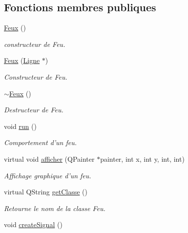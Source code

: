 \subsection*{Fonctions membres publiques}
\begin{DoxyCompactItemize}
\item 
\hypertarget{classFeux_a2474d3dc42d3a0d60427f0d2ccf2472e}{
\hyperlink{classFeux_a2474d3dc42d3a0d60427f0d2ccf2472e}{Feux} ()}
\label{classFeux_a2474d3dc42d3a0d60427f0d2ccf2472e}

\begin{DoxyCompactList}\small\item\em constructeur de Feu. \item\end{DoxyCompactList}\item 
\hyperlink{classFeux_a875eac84cbac9d6ea9f2505cb59b0701}{Feux} (\hyperlink{classLigne}{Ligne} $\ast$)
\begin{DoxyCompactList}\small\item\em Constructeur de Feu. \item\end{DoxyCompactList}\item 
\hypertarget{classFeux_a83d13185bdc10129517185ac9579339b}{
\hyperlink{classFeux_a83d13185bdc10129517185ac9579339b}{$\sim$Feux} ()}
\label{classFeux_a83d13185bdc10129517185ac9579339b}

\begin{DoxyCompactList}\small\item\em Destructeur de Feu. \item\end{DoxyCompactList}\item 
\hypertarget{classFeux_a5a868ea5221a779cd2334f892dba0241}{
void \hyperlink{classFeux_a5a868ea5221a779cd2334f892dba0241}{run} ()}
\label{classFeux_a5a868ea5221a779cd2334f892dba0241}

\begin{DoxyCompactList}\small\item\em Comportement d'un feu. \item\end{DoxyCompactList}\item 
virtual void \hyperlink{classFeux_a8bb7f9817c38d79927c9a4b471534889}{afficher} (QPainter $\ast$painter, int x, int y, int, int)
\begin{DoxyCompactList}\small\item\em Affichage graphique d'un feu. \item\end{DoxyCompactList}\item 
virtual QString \hyperlink{classFeux_ac06b420ea2bb015007eb03ca2401176e}{getClasse} ()
\begin{DoxyCompactList}\small\item\em Retourne le nom de la classe Feu. \item\end{DoxyCompactList}\item 
\hypertarget{classFeux_af8488543d58945794535cca3ce9017a0}{
void \hyperlink{classFeux_af8488543d58945794535cca3ce9017a0}{createSignal} ()}
\label{classFeux_af8488543d58945794535cca3ce9017a0}


\end{DoxyCompactItemize}
